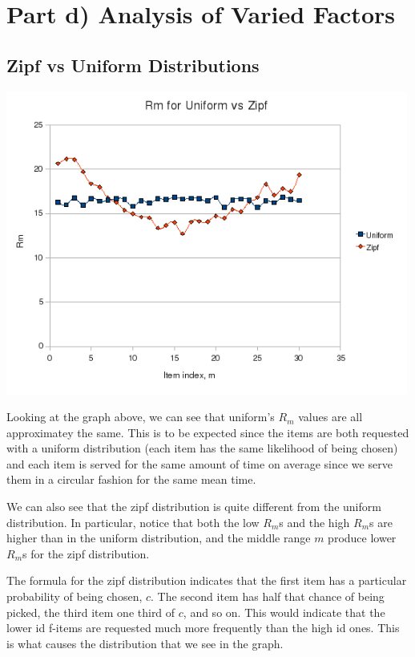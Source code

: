 \documentclass[12pt]{article}
\begin{document}
\section{Part d) Analysis of Varied Factors}

\begin{table}[htp!]
\subsection{Zipf vs Uniform Distributions}
\begin{center}
\includegraphics[height=10cm]{uniform_vs_zipf.png}
\end{center}
\end{table}

Looking at the graph above, we can see that uniform's $R_m$ values are all
approximatey the same.  This is to be expected since the items are both
requested with a uniform distribution (each item has the same likelihood of
being chosen) and each item is served for the same amount of time on average
since we serve them in a circular fashion for the same mean time.

We can also see that the zipf distribution is quite different from the uniform
distribution.  In particular, notice that both the low $R_m$s and the high
$R_m$s are higher than in the uniform distribution, and the middle range $m$
produce lower $R_m$s for the zipf distribution.

The formula for the zipf distribution indicates that the first item has a
particular probability of being chosen, $c$.  The second item has half that
chance of being picked, the third item one third of $c$, and so on.  This would
indicate that the lower id f-items are requested much more frequently than the
high id ones.  This is what causes the distribution that we see in the graph.
\end{document}
